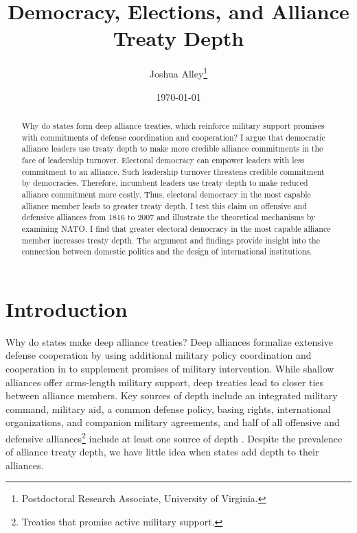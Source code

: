 \documentclass[12pt]{article}
\title{\textbf{Democracy, Elections, and Alliance Treaty Depth}}
\author{Joshua Alley\footnote{Postdoctoral Research Associate,
University of Virginia.}}
\date{\today}
\begin{document}
\maketitle 

\doublespace 

\begin{abstract}
Why do states form deep alliance treaties, which reinforce military support promises with commitments of defense coordination and cooperation? 
I argue that democratic alliance leaders use treaty depth to make more credible alliance commitments in the face of leadership turnover. 
Electoral democracy can empower leaders with less commitment to an alliance. 
Such leadership turnover threatens credible commitment by democracies. 
Therefore, incumbent leaders use treaty depth to make reduced alliance commitment more costly. 
Thus, electoral democracy in the most capable alliance member leads to greater treaty depth.
I test this claim on offensive and defensive alliances from 1816 to 2007 and illustrate the theoretical mechanisms by examining NATO.
I find that greater electoral democracy in the most capable alliance member increases treaty depth. 
The argument and findings provide insight into the connection between domestic politics and the design of international institutions. 
\end{abstract}


\newpage 


\section{Introduction}


Why do states make deep alliance treaties? 
Deep alliances formalize extensive defense cooperation by using additional military policy coordination and cooperation in to supplement promises of military intervention. 
While shallow alliances offer arms-length military support, deep treaties lead to closer ties between alliance members. 
Key sources of depth include an integrated military command, military aid, a common defense policy, basing rights, international organizations, and companion military agreements, and half of all offensive and defensive alliances\footnote{Treaties that promise active military support.} include at least one source of depth \citep{Leedsetal2002}. 
Despite the prevalence of alliance treaty depth, we have little idea when states add depth to their alliances. 
\end{document}
